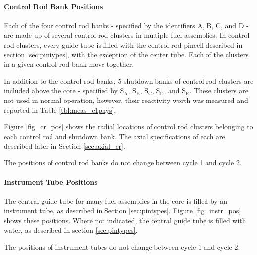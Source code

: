 
\paragraph{Control Rod Bank Positions}

Each of the four control rod banks - specified by the identifiers A, B, C, and D
- are made up of several control rod clusters in multiple fuel assemblies. In
control rod clusters, every guide tube is filled with the control rod pincell
described in section \ref{sec:pintypes}, with the exception of the center
tube. Each of the clusters in a given control rod bank move together.

In addition to the control rod banks, 5 shutdown banks of control rod clusters
are included above the core - specified by $\mathrm{S}_\mathrm{A}$,
$\mathrm{S}_\mathrm{B}$, $\mathrm{S}_\mathrm{C}$, $\mathrm{S}_\mathrm{D}$, and
$\mathrm{S}_\mathrm{E}$. These clusters are not used in normal operation,
however, their reactivity worth was measured and reported in Table
\ref{tbl:meas_c1phys}.

Figure \ref{fig_cr_pos} shows the radial locations of control rod clusters
belonging to each control rod and shutdown bank. The axial specifications of
each are described later in Section \ref{sec:axial_cr}.

The positions of control rod banks do not change between cycle 1 and cycle 2.


\FloatBarrier
\paragraph{Instrument Tube Positions}
\label{sec:coreinstrpos}

The central guide tube for many fuel assemblies in the core is filled by an
instrument tube, as described in Section \ref{sec:pintypes}. Figure
\ref{fig_instr_pos} shows these positions. Where not indicated, the central
guide tube is filled with water, as described in section \ref{sec:pintypes}.

The positions of instrument tubes do not change between cycle 1 and cycle 2.


\FloatBarrier
